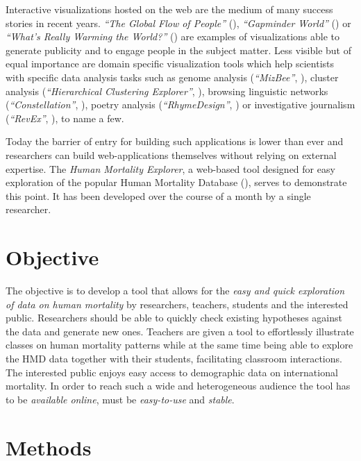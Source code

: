 \documentclass[
  12pt
]{scrartcl}
\begin{document}
Interactive visualizations hosted on the web are the medium of many success stories in recent years. \emph{\enquote{The Global Flow of People}} (\cite{Sander2014}), \emph{\enquote{Gapminder World}} (\cite{Rosling2006}) or \emph{\enquote{What's Really Warming the World?}} (\cite{Roston2015}) are examples of visualizations able to generate publicity and to engage people in the subject matter. Less visible but of equal importance are domain specific visualization tools which help scientists with specific data analysis tasks such as genome analysis (\emph{\enquote{MizBee}}, \cite{Meyer2009}), cluster analysis (\emph{\enquote{Hierarchical Clustering Explorer}}, \cite{Seo2002}), browsing linguistic networks (\emph{\enquote{Constellation}}, \cite{Munzner1999}), poetry analysis (\emph{\enquote{RhymeDesign}}, \cite{McCurdy2015}) or investigative journalism (\emph{\enquote{RevEx}}, \cite{Bertini2015}), to name a few.

Today the barrier of entry for building such applications is lower than ever and researchers can build web-applications themselves without relying on external expertise. The \emph{Human Mortality Explorer}, a web-based tool designed for easy exploration of the popular Human Mortality Database (\cite{Hmd2016}), serves to demonstrate this point. It has been developed over the course of a month by a single researcher.

\section*{Objective}

The objective is to develop a tool that allows for the \emph{easy and quick exploration of data on human mortality} by researchers, teachers, students and the interested public. Researchers should be able to quickly check existing hypotheses against the data and generate new ones. Teachers are given a tool to effortlessly illustrate classes on human mortality patterns while at the same time being able to explore the HMD data together with their students, facilitating classroom interactions. The interested public enjoys easy access to demographic data on international mortality. In order to reach such a wide and heterogeneous audience the tool has to be \emph{available online}, must be \emph{easy-to-use} and \emph{stable}.

\section*{Methods}
\end{document}
